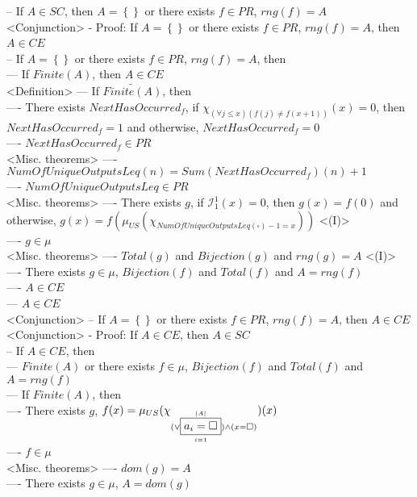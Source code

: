 \documentclass{book}
\newcommand{\pnot}[1]{\widetilde{#1}}
\newcommand{\inot}{\not}
\newcommand{\placeholder}{\square}
\newcommand{\set}[1]{\left\{ #1 \right\}}
\newcommand{\vdc}[3]{\underset{#2}{\overset{#3}{\fbox{$#1$}}}}
\begin{document}
		-- If $A \in SC$, then $A = \set{}$ or there exists $f \in PR$, $rng(f) = A$ \\ <Conjunction>
	- Proof: If $A = \set{}$ or there exists $f \in PR$, $rng(f) = A$, then $A \in CE$ \ \\
		-- If $A = \set{}$ or there exists $f \in PR$, $rng(f) = A$, then \\
			--- If $Finite(A)$, then $A \in CE$ \\ <Definition>
			--- If $\pnot{Finite(A)}$, then \\
				---- There exists $NextHasOccurred_f$, if $\chi_{(\forall j \leq x)(f(j) \inot = f(x+1))}(x) = 0$, then $NextHasOccurred_f = 1$ and otherwise, $NextHasOccurred_f = 0$ \\
				---- $NextHasOccurred_f \in PR$ \\ <Misc. theorems>
				---- $NumOfUniqueOutputsLeq(n) = Sum(NextHasOccurred_f)(n)+1$ \\
				---- $NumOfUniqueOutputsLeq \in PR$ \\ <Misc. theorems>
				---- There exists $g$, if $\mathcal{I}_1^1(x) = 0$, then $g(x) = f(0)$ and otherwise, $g(x) = f(\mu_{US}(\chi_{NumOfUniqueOutputsLeq(\placeholder)-1 = x}))$	<(I)> \\
				---- $g \in \mu$ \\ <Misc. theorems>
				---- $Total(g)$ and $Bijection(g)$ and $rng(g) = A$ <(I)> \\
				---- There exists $g \in \mu$, $Bijection(f)$ and $Total(f)$ and $A = rng(f)$ \\ 
				---- $A \in CE$ \\
			--- $A \in CE$ \\ <Conjunction>
		-- If $A = \set{}$ or there exists $f \in PR$, $rng(f) = A$, then $A \in CE$ \\ <Conjunction>
	- Proof: If $A \in CE$, then $A \in SC$ \\
		-- If $A \in CE$, then \\
			--- $Finite(A)$ or there exists $f \in \mu$, $Bijection(f)$ and $Total(f)$ and $A = rng(f)$ \\
			--- If $Finite(A)$, then \\
				---- There exists $g$, $f(x) = \mu_{US}(\chi_{(\lor \vdc{a_i = \placeholder}{i=1}{|A|}) \land (x = \placeholder)})(x)$ \\
				---- $f \in \mu$ \\ <Misc. theorems>
				---- $dom(g) = A$ \\
				---- There exists $g \in \mu$, $A = dom(g)$ \\
\end{document}
